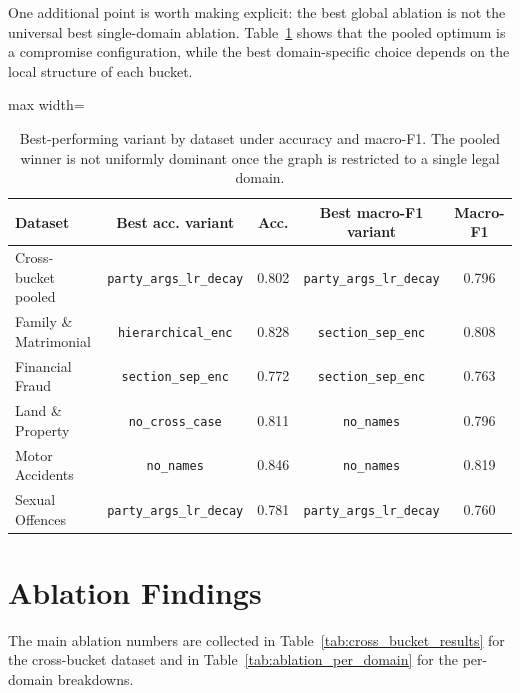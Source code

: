 {One additional point is worth making explicit: the best
global ablation is not the universal best single-domain ablation.
Table~\ref{tab:best_variant_by_dataset} shows that the pooled optimum
is a compromise configuration, while the best domain-specific choice
depends on the local structure of each bucket.\par}

{
\begin{table}[H]
  \centering
  \scriptsize
  \begin{adjustbox}{max width=\textwidth}
  \begin{tabular}{lcccc}
    \toprule
    Dataset & Best acc. variant & Acc. & Best macro-F1 variant & Macro-F1 \\
    \midrule
    Cross-bucket pooled & \texttt{party\_args\_lr\_decay} & 0.802 & \texttt{party\_args\_lr\_decay} & 0.796 \\
    Family \& Matrimonial & \texttt{hierarchical\_enc} & 0.828 & \texttt{section\_sep\_enc} & 0.808 \\
    Financial Fraud & \texttt{section\_sep\_enc} & 0.772 & \texttt{section\_sep\_enc} & 0.763 \\
    Land \& Property & \texttt{no\_cross\_case} & 0.811 & \texttt{no\_names} & 0.796 \\
    Motor Accidents & \texttt{no\_names} & 0.846 & \texttt{no\_names} & 0.819 \\
    Sexual Offences & \texttt{party\_args\_lr\_decay} & 0.781 & \texttt{party\_args\_lr\_decay} & 0.760 \\
    \bottomrule
  \end{tabular}
  \end{adjustbox}
  \caption{{Best-performing variant by dataset under
  accuracy and macro-F1. The pooled winner is not uniformly dominant
  once the graph is restricted to a single legal domain.}}
  \label{tab:best_variant_by_dataset}
\end{table}
}

\section{Ablation Findings}
\label{sec:ablation_findings}

The main ablation numbers are collected in
Table~\ref{tab:cross_bucket_results} for the cross-bucket dataset and
in Table~\ref{tab:ablation_per_domain} for the per-domain
breakdowns.

